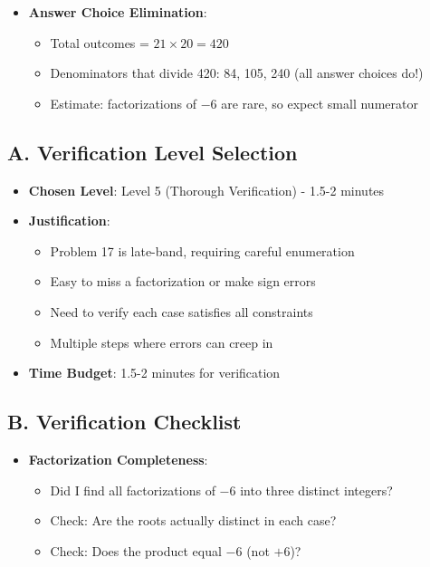 \documentclass[12pt]{article}
\begin{document}
\begin{techniquesbox}
\begin{itemize}[leftmargin=*]
    \item \textbf{Answer Choice Elimination}:
    \begin{itemize}
        \item Total outcomes = $21 \times 20 = 420$
        \item Denominators that divide 420: 84, 105, 240 (all answer choices do!)
        \item Estimate: factorizations of $-6$ are rare, so expect small numerator
    \end{itemize}
\end{itemize}
\end{techniquesbox}

\begin{verificationbox}
\subsection*{A. Verification Level Selection}
\begin{itemize}[leftmargin=*]
    \item \textbf{Chosen Level}: Level 5 (Thorough Verification) - 1.5-2 minutes
    
    \item \textbf{Justification}: 
    \begin{itemize}
        \item Problem 17 is late-band, requiring careful enumeration
        \item Easy to miss a factorization or make sign errors
        \item Need to verify each case satisfies all constraints
        \item Multiple steps where errors can creep in
    \end{itemize}
    
    \item \textbf{Time Budget}: 1.5-2 minutes for verification
\end{itemize}

\subsection*{B. Verification Checklist}
\begin{itemize}[leftmargin=*]
    \item \textbf{Factorization Completeness}:
    \begin{itemize}
        \item Did I find all factorizations of $-6$ into three distinct integers?
        \item Check: Are the roots actually distinct in each case?
        \item Check: Does the product equal $-6$ (not $+6$)?
    \end{itemize}
    

\end{itemize}
\end{verificationbox}
\end{document}

